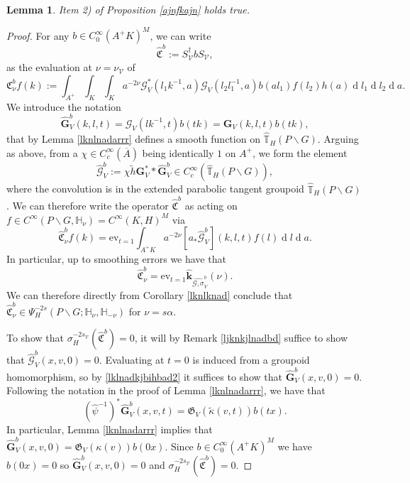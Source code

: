 \documentclass[a4paper,reqno]{amsart}
\numberwithin{equation}{section}
\def\rd{\operatorname{d}\!}
\def\T{\mathbb{T}}
\newtheorem{lemma}[thm]{Lemma}
\theoremstyle{definition}
\theoremstyle{remark}
\begin{document}
\begin{lemma}
Item 2) of Proposition \ref{ajnfkajn} holds true.
\end{lemma}

\begin{proof}
For any $b\in C^\infty_0(A^+K)^M$, we can write 
$$\hat{\mathfrak{C}}^b:=S_{\mathcal{V}}^\dagger b S_{\mathcal{V}},$$
as the evaluation at $\nu=\nu_{\mathcal{V}}$ of
$$\mathfrak{C}^b_\nu f(k):=\int_{A^+}\int_{K}\int_K a^{-2\nu}  \mathcal{G}_V^*(l_1k^{-1},a)\mathcal{G}_V(l_2l_1^{-1},a)b(al_1)f(l_2)h(a)\rd l_1\rd l_2\rd a.$$
We introduce the notation 
$$\hat{\pmb{G}}_V^b(k,l,t)=\mathcal{G}_V(lk^{-1},t)b(tk)=\pmb{G}_V(k,l,t)b(tk),$$
that by Lemma \ref{lknlnadarrr} defines a smooth function on $\hat{\T}_H(P\backslash G)$. Arguing as above, from a $\chi\in C^\infty_c(\overline{A})$ being identically $1$ on $A^+$, we form the element
\begin{equation}
\label{lklnadkjbihbad2}
\hat{\pmb{\mathcal{G}}}_V^b:=\chi\tilde{h}\pmb{G}_V^**\hat{\pmb{G}}_V^b \in C^\infty_c(\hat{\T}_H(P\backslash G)),
\end{equation}
where the convolution is in the extended parabolic tangent groupoid $\hat{\T}_H(P\backslash G)$. We can therefore write the operator $\hat{\mathfrak{C}}^b$ as acting on $f\in C^\infty(P\backslash G,\mathbb{H}_\nu)=C^\infty(K,H)^M$ via
$$\hat{\mathfrak{C}}^b_\nu f(k)=\mathrm{ev}_{t=1}\int_{A^+K} a^{-2\nu} [a_*\hat{\pmb{\mathcal{G}}}^b_V](k,l,t)f(l)\rd l \rd a.$$
In particular, up to smoothing errors we have that 
$$\hat{\mathfrak{C}}_\nu^b=\mathrm{ev}_{t=1}\hat{\pmb{k}}_{\hat{\pmb{\mathcal{G}},\sigma}_V^b}(\nu).$$
We can therefore directly from Corollary \ref{lknlknad} conclude that $\hat{\mathfrak{C}}^b_\nu\in \Psi^{-2s}_H(P\backslash G;\mathbb{H}_\nu,\mathbb{H}_{-\nu})$ for $\nu=s\alpha$. 

To show that $\sigma_H^{-2s_\mathcal{V}}(\hat{\mathfrak{C}}^b)=0$, it will by Remark \ref{ljknkjlnadbd} suffice to show that $\hat{\pmb{\mathcal{G}}}_V^b(x,v,0)=0$. Evaluating at $t=0$ is induced from a groupoid homomorphism, so by \eqref{lklnadkjbihbad2} it suffices to show that $\hat{\pmb{G}}_V^b(x,v,0)=0$. Following the notation in the proof of Lemma \ref{lknlnadarrr}, we have that 
$$(\hat{\psi}^{-1})^*\hat{\pmb{G}}_V^b(x,v,t)=\mathfrak{G}_V(\tilde{\kappa}(v,t))b(tx).$$
In particular, Lemma \ref{lknlnadarrr} implies that $\hat{\pmb{G}}_V^b(x,v,0)=\mathfrak{G}_V(\kappa(v))b(0x)$. Since $b\in C^\infty_0(A^+K)^M$ we have $b(0x)=0$ so $\hat{\pmb{G}}_V^b(x,v,0)=0$ and $\sigma_H^{-2s_\mathcal{V}}(\hat{\mathfrak{C}}^b)=0$.
\end{proof}
\end{document}
